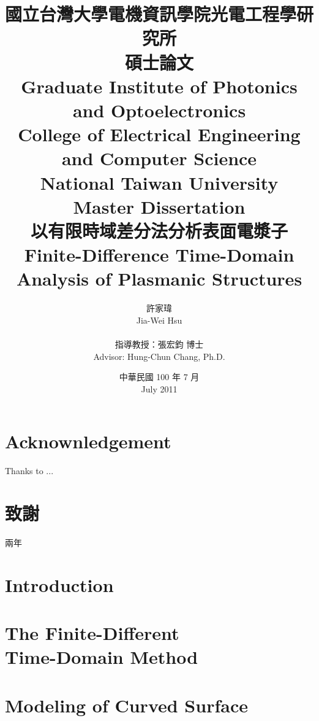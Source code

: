 \documentclass{book}
\begin{document}
\fontsize{12}{2em}\selectfont

\title{
  \kai 國立台灣大學電機資訊學院光電工程學研究所\\碩士論文\\
  \rm Graduate Institute of Photonics and Optoelectronics\\College of Electrical Engineering and Computer Science\\National Taiwan University\\Master Dissertation\\[1cm]
  \kai 以有限時域差分法分析表面電漿子\\
  \rm Finite-Difference Time-Domain Analysis of Plasmanic Structures
}
\author{
  \kai 許家瑋\\ \rm Jia-Wei Hsu\\\\
  \kai 指導教授：張宏鈞 博士\\ \rm Advisor: Hung-Chun Chang, Ph.D.
}
\date{
  \kai 中華民國 100 年 7 月\\ 
  \rm July 2011
}

\maketitle
{}
\tableofcontents


\chapter*{Acknownledgement}
Thanks to ...


\chapter*{\kai 致謝}
\kai
兩年
\rm

\chapter{Introduction}
\setcounter{page}{1}



\chapter{The Finite-Different \\Time-Domain Method}




\chapter{Modeling of Curved Surface}
\end{document}
